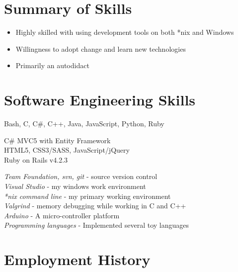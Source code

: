 \documentclass[9pt]{article} %
\begin{document}
\section{Summary of Skills}
\begin{itemize}
\item Highly skilled with using development tools on both *nix and Windows
\item Willingness to adopt change and learn new technologies
\item Primarily an autodidact
\end{itemize}

\section{Software Engineering Skills}

{
  Bash, C, C\#, C++, Java, JavaScript, Python, Ruby
}


{
  C\# MVC5 with Entity Framework \\
  HTML5, CSS3/SASS, JavaScript/jQuery \\
  Ruby on Rails v4.2.3 \\
}


{
\textit{Team Foundation, svn, git} - source version control \\
\textit{Visual Studio} - my windows work environment \\
\textit{*nix command line} - my primary working environment \\
\textit{Valgrind} - memory debugging while working in C and C++ \\
\textit{Arduino} - A micro-controller platform \\
\textit{Programming languages} - Implemented several toy languages
}


\section{Employment History}
\end{document}
